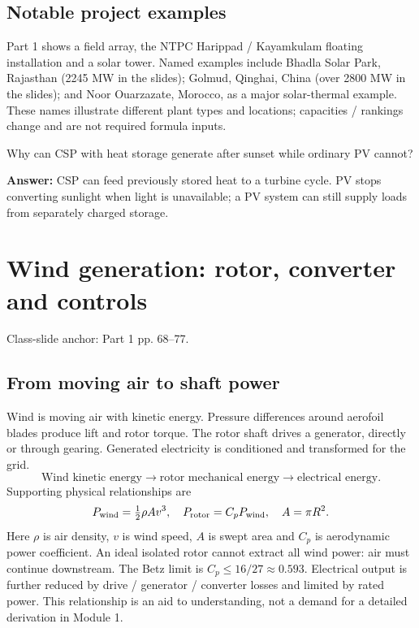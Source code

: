 \documentclass[11pt,a4paper]{article}
\newcommand{\slides}[1]{{\small\color{muted}\textsf{Class-slide anchor: #1.}}\par}
\newcommand{\chapterstart}[2]{\clearpage\section{#1}\label{#2}}
\newcommand{\checkq}[2]{\begin{tcolorbox}[breakable=false,colback=pale,colframe=teal,coltitle=white,title={Check your understanding}]#1\par\textbf{Answer:} #2\end{tcolorbox}}
\begin{document}
\subsection{Notable project examples}
Part 1 shows a field array, the NTPC Harippad / Kayamkulam floating installation and a solar tower. Named examples include Bhadla Solar Park, Rajasthan (2245 MW in the slides); Golmud, Qinghai, China (over 2800 MW in the slides); and Noor Ouarzazate, Morocco, as a major solar-thermal example. These names illustrate different plant types and locations; capacities / rankings change and are not required formula inputs.
\checkq{Why can CSP with heat storage generate after sunset while ordinary PV cannot?}{CSP can feed previously stored heat to a turbine cycle. PV stops converting sunlight when light is unavailable; a PV system can still supply loads from separately charged storage.}

\chapterstart{Wind generation: rotor, converter and controls}{wind}
\slides{Part 1 pp. 68--77}
\subsection{From moving air to shaft power}
Wind is moving air with kinetic energy. Pressure differences around aerofoil blades produce lift and rotor torque. The rotor shaft drives a generator, directly or through gearing. Generated electricity is conditioned and transformed for the grid.
\[
\text{Wind kinetic energy}\to\text{rotor mechanical energy}\to\text{electrical energy}.
\]
Supporting physical relationships are
\[
P_{\rm wind}=\tfrac12\rho A v^3,\quad
P_{\rm rotor}=C_pP_{\rm wind},\quad A=\pi R^2.
\]
Here $\rho$ is air density, $v$ is wind speed, $A$ is swept area and $C_p$ is aerodynamic power coefficient. An ideal isolated rotor cannot extract all wind power: air must continue downstream. The Betz limit is $C_p\le16/27\approx0.593$. Electrical output is further reduced by drive / generator / converter losses and limited by rated power. This relationship is an aid to understanding, not a demand for a detailed derivation in Module 1.
\end{document}
